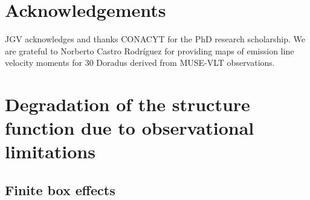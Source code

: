 \documentclass[fleqn,usenatbib, useAMS, a4paper]{mnras}
\begin{document}

\section*{Acknowledgements}

JGV acknowledges and thanks CONACYT for the PhD research scholarship. We are grateful to Norberto Castro Rodríguez for providing maps of emission line velocity moments for 30 Doradus derived from MUSE-VLT observations.







\appendix

\section{Degradation of the structure function due to observational limitations}
\label{sec:degr-struct-funct}

\subsection{Finite box effects}
\label{sec:finite-box-effects}
\end{document}
